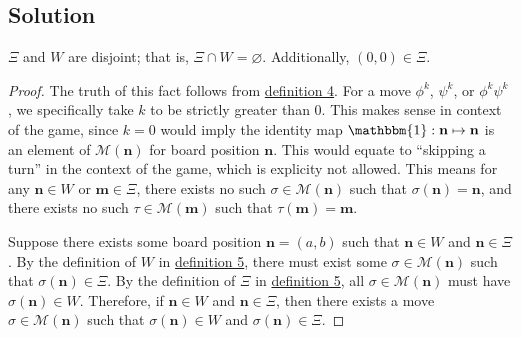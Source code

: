\documentclass[11pt, letterpaper]{article}
\begin{document}
\subsection{Solution}\label{sec:22}
\begin{theorem}\label{thm:1}
	$\Xi $ and $W$ are disjoint; that is, $\Xi \cap W=\varnothing$. Additionally, $(0,0)\in \Xi $.
\end{theorem}
\begin{proof}
	The truth of this fact follows from \hyperref[dfn:4]{definition 4}. For a move $\phi ^k$, $\psi ^k$, or $\phi ^k\psi ^k$, we specifically take $k$ to be strictly greater than $0$. This makes sense in context of the game, since $k=0$ would imply the identity map $\mathbbm{1}: \mathbf{n}\mapsto \mathbf{n}$ is an element of $\mathscr{M}  (\mathbf{n})$ for board position $\mathbf{n}$. This would equate to ``skipping a turn'' in the context of the game, which is explicity not allowed. This means for any $\mathbf{n}\in W$ or $\mathbf{m}\in \Xi $, there exists no such $\sigma \in \mathscr{M} (\mathbf{n})$ such that $\sigma (\mathbf{n})=\mathbf{n}$, and there exists no such $\tau \in \mathscr{M} (\mathbf{m})$ such that $\tau (\mathbf{m})=\mathbf{m}$.

	Suppose there exists some board position $\mathbf{n}=(a,b)$ such that $\mathbf{n}\in W$ and $\mathbf{n}\in \Xi $. By the definition of $W$ in \hyperref[dfn:5]{definition 5}, there must exist some $\sigma \in \mathscr{M} (\mathbf{n})$ such that $\sigma (\mathbf{n})\in \Xi $. By the definition of $\Xi $ in \hyperref[dfn:5]{definition 5}, all $\sigma \in \mathscr{M} (\mathbf{n})$ must have $\sigma (\mathbf{n})\in W$. Therefore, if $\mathbf{n}\in W$ and $\mathbf{n}\in \Xi $, then there exists a move $\sigma \in \mathscr{M} (\mathbf{n})$ such that $\sigma (\mathbf{n})\in W$ and $\sigma (\mathbf{n})\in \Xi $.
	

\end{proof}
\end{document}
